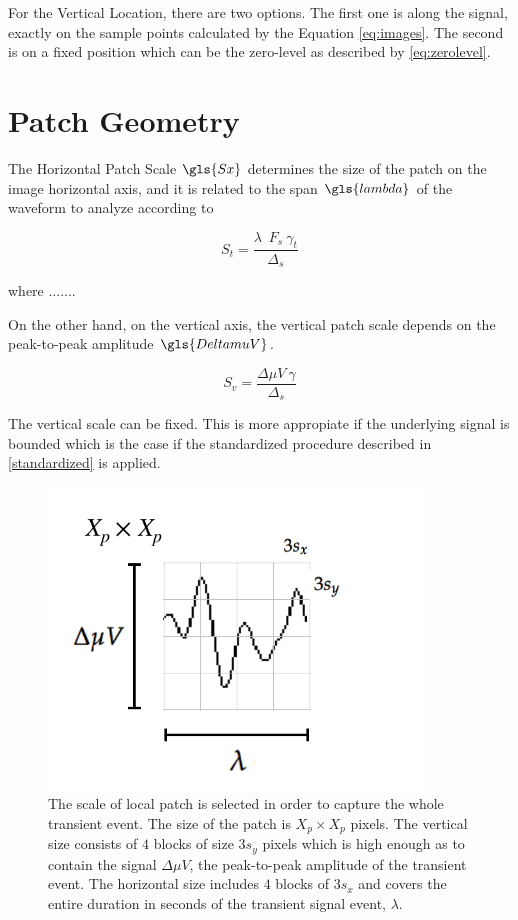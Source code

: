 For the Vertical Location, there are two options.  The first one is along the signal, exactly on the sample points calculated by the Equation \ref{eq:images}.  The second is on a fixed position which can be the zero-level as described by \ref{eq:zerolevel}.

\section{Patch Geometry}

The Horizontal Patch Scale $\gls{Sx}$ determines the size of the patch on the image horizontal axis, and it is related to the span $\gls{lambda}$ of the waveform to analyze according to

\begin{equation}
S_t = \frac{ \lambda \;  \  F_s \ \gamma_t }{\Delta_s}
\label{eq:horizontalpatchscale}
\end{equation}

\noindent where ....... 

On the other hand, on the vertical axis, the vertical patch scale depends on the peak-to-peak amplitude $\gls{DeltamuV}$.

\begin{equation}
S_v= \frac{\Delta \mu V \ \gamma}{\Delta_s} 
\label{eq:mapping1}
\end{equation}

The vertical scale can be fixed.  This is more appropiate if the underlying signal is bounded which is the case if the standardized procedure described in \ref{standardized} is applied.

\begin{figure}[h!]
\centering
\includegraphics[width=10cm]{images/patchgeometry.pdf}
\caption[Patch Geometry]{The scale of local patch is selected in order to capture the whole transient event.  The size of the patch is $X_p \times X_p$ pixels. The vertical size consists of $4$ blocks of size $3 s_y$ pixels which is high enough as to contain the signal $\Delta  \mu V $, the peak-to-peak amplitude of the transient event. The horizontal size includes $4$ blocks  of $3 s_x$ and covers the entire duration in seconds of the transient signal event, $ \lambda $.   }
\label{fig:patchgeometry}
\end{figure}

